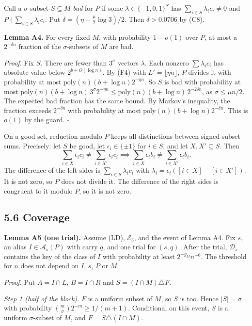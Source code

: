 \documentclass[10pt,a4paper]{article}
\begin{document}
Call a $\sigma$-subset $S \subseteq M$ \emph{bad} for $P$ if some $\lambda \in \{-1, 0, 1\}^S$ has
$\sum_{i\in S}\lambda_ic_i \ne 0$ and $P \mid \sum_{i\in S}\lambda_ic_i$. Put $\delta = (\eta - \tfrac\mu2\log3)/2$.
Then $\delta > 0.0706$ by (C8).

\textbf{Lemma A4.} For every fixed $M$, with probability $1 - o(1)$ over $P$, at most a $2^{-\delta n}$ fraction of the
$\sigma$-subsets of $M$ are bad.

\emph{Proof.} Fix $S$. There are fewer than $3^\sigma$ vectors $\lambda$. Each nonzero $\sum\lambda_ic_i$ has absolute value
below $2^{b + O(\log n)}$. By (F4) with $L' = \lfloor\eta n\rfloor$, $P$ divides it with probability at most
$\mathrm{poly}(n)(b + \log n)2^{-\eta n}$. So $S$ is bad with probability at most
$\mathrm{poly}(n)(b+\log n)\,3^\sigma2^{-\eta n} \le \mathrm{poly}(n)(b + \log n)\,2^{-2\delta n}$, as $\sigma \le \mu n/2$.
The expected bad fraction has the same bound. By Markov's inequality, the fraction exceeds $2^{-\delta n}$ with
probability at most $\mathrm{poly}(n)(b+\log n)2^{-\delta n}$. This is $o(1)$ by the guard. $\square$

On a good set, reduction modulo $P$ keeps all distinctions between signed subset sums. Precisely: let $S$ be good, let
$\epsilon_i \in \{\pm1\}$ for $i \in S$, and let $X, X' \subseteq S$. Then
\[\sum_{i\in X}\epsilon_ic_i \ne \sum_{i\in X'}\epsilon_ic_i \implies \sum_{i\in X}\epsilon_ib_i \ne \sum_{i\in X'}\epsilon_ib_i. \tag{5.3}\]
The difference of the left sides is $\sum_{i\in S}\lambda_ic_i$ with $\lambda_i = \epsilon_i([i\in X] - [i\in X'])$. It is
not zero, so $P$ does not divide it. The difference of the right sides is congruent to it modulo $P$, so it is not zero.

\subsection*{5.6 Coverage}

\textbf{Lemma A5 (one trial).} Assume (LD), $\mathcal E_3$, and the event of Lemma A4. Fix $s$, an alias $I \in \mathcal A_s(P)$
with carry $q$, and one trial for $(s, q)$. After the trial, $\mathcal D_s$ contains the key of the class of $I$ with
probability at least $2^{-g_M}n^{-6}$. The threshold for $n$ does not depend on $I$, $s$, $P$ or $M$.

\emph{Proof.} Put $A = I\cap L$, $B = I\cap R$ and $S = (I\cap M)\triangle F$.

\emph{Step 1 (half of the block).} $F$ is a uniform subset of $M$, so $S$ is too. Hence $|S| = \sigma$ with probability
$\binom m\sigma2^{-m} \ge 1/(m+1)$. Conditional on this event, $S$ is a uniform $\sigma$-subset of $M$, and
$F = S\triangle(I\cap M)$.
\end{document}
